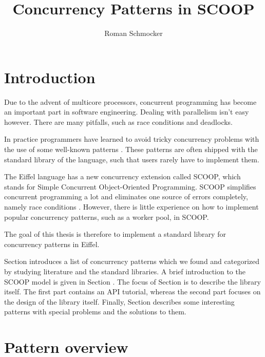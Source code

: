 \documentclass[a4paper,10pt]{report}
\title{Concurrency Patterns in SCOOP}
\author{Roman Schmocker}
\newcommand{\todoref}{\todo{ref}}
\begin{document}
\maketitle

\begin{abstract}

\end{abstract}

\tableofcontents

\section{Introduction}

Due to the advent of multicore processors, concurrent programming has become an important part in software engineering.
Dealing with parallelism isn't easy however.
There are many pitfalls, such as race conditions and deadlocks.

In practice programmers have learned to avoid tricky concurrency problems with the use of some well-known patterns .
These patterns are often shipped with the standard library of the language, such that users rarely have to implement them.

The Eiffel language  has a new concurrency extension called SCOOP, which stands for Simple Concurrent Object-Oriented Programming.
SCOOP simplifies concurrent programming a lot and eliminates one source of errors completely, namely race conditions .
However, there is little experience on how to implement popular concurrency patterns, such as a worker pool, in SCOOP.

The goal of this thesis is therefore to implement a standard library for concurrency patterns in Eiffel.

Section \todoref introduces a list of concurrency patterns which we found and categorized by studying literature and the standard libraries.
A brief introduction to the SCOOP model is given in Section \todoref.
The focus of Section \todoref is to describe the library itself.
The first part contains an API tutorial, whereas the second part focuses on the design of the library itself.
Finally, Section \todoref describes some interesting patterns with special problems and the solutions to them.

\section {Pattern overview}
\end{document}
